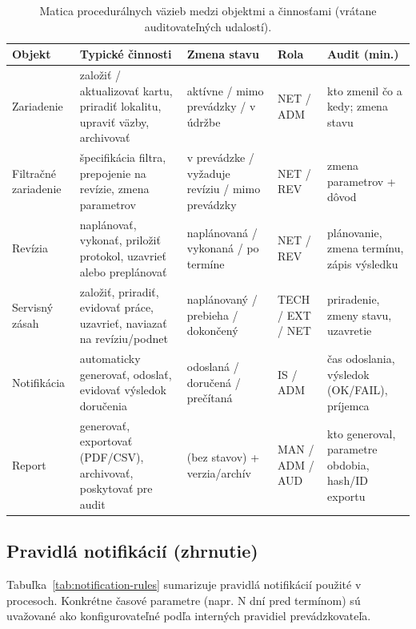 \begin{table}[!htbp]
\centering
\small
\setlength{\tabcolsep}{3pt}
\renewcommand{\arraystretch}{1.2}
\begin{tabularx}{\textwidth}{>{\raggedright\arraybackslash}p{22mm} >{\raggedright\arraybackslash}X >{\raggedright\arraybackslash}p{32mm} >{\raggedright\arraybackslash}p{13mm} >{\raggedright\arraybackslash}p{30mm}}
\toprule
\textbf{Objekt} & \textbf{Typické činnosti} & \textbf{Zmena stavu} & \textbf{Rola} & \textbf{Audit (min.)} \\
\midrule
Zariadenie & založiť / aktualizovať kartu, priradiť lokalitu, upraviť väzby, archivovať & aktívne / mimo prevádzky / v údržbe & NET / ADM & kto zmenil čo a kedy; zmena stavu \\
\midrule
Filtračné zariadenie & špecifikácia filtra, prepojenie na revízie, zmena parametrov & v prevádzke / vyžaduje revíziu / mimo prevádzky & NET / REV & zmena parametrov + dôvod \\
\midrule
Revízia & naplánovať, vykonať, priložiť protokol, uzavrieť alebo preplánovať & naplánovaná / vykonaná / po termíne & NET / REV & plánovanie, zmena termínu, zápis výsledku \\
\midrule
Servisný zásah & založiť, priradiť, evidovať práce, uzavrieť, naviazať na revíziu/podnet & naplánovaný / prebieha / dokončený & TECH / EXT / NET & priradenie, zmeny stavu, uzavretie \\
\midrule
Notifikácia & automaticky generovať, odoslať, evidovať výsledok doručenia & odoslaná / doručená / prečítaná & IS / ADM & čas odoslania, výsledok (OK/FAIL), príjemca \\
\midrule
Report & generovať, exportovať (PDF/CSV), archivovať, poskytovať pre audit & (bez stavov) + verzia/archív & MAN / ADM / AUD & kto generoval, parametre obdobia, hash/ID exportu \\
\bottomrule
\end{tabularx}
\caption{Matica procedurálnych väzieb medzi objektmi a činnosťami (vrátane auditovateľných udalostí).}
\label{tab:object-activity-matrix}
\end{table}

\subsection{Pravidlá notifikácií (zhrnutie)}

Tabuľka~\ref{tab:notification-rules} sumarizuje pravidlá notifikácií použité v procesoch. Konkrétne časové parametre (napr. N dní pred termínom) sú uvažované ako konfigurovateľné podľa interných pravidiel prevádzkovateľa.

